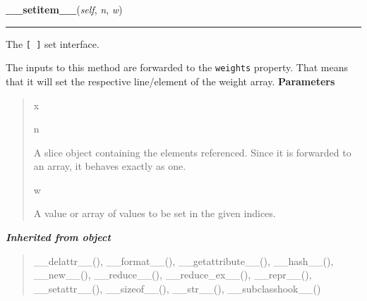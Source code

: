     \label{peach:nn:base:Layer:__setitem__}

    \vspace{0.5ex}

\hspace{.8\funcindent}\begin{boxedminipage}{\funcwidth}

    \raggedright \textbf{\_\_setitem\_\_}(\textit{self}, \textit{n}, \textit{w})

    \vspace{-1.5ex}

    \rule{\textwidth}{0.5\fboxrule}
\setlength{\parskip}{2ex}

The \texttt{{[} {]}} set interface.

The inputs to this method are forwarded to the \texttt{weights} property.
That means that it will set the respective line/element of the weight
array.
\setlength{\parskip}{1ex}
      \textbf{Parameters}
      \vspace{-1ex}

      \begin{quote}
        \begin{Ventry}{x}

          \item[n]


A slice object containing the elements referenced. Since it is
forwarded to an array, it behaves exactly as one.
          \item[w]


A value or array of values to be set in the given indices.
        \end{Ventry}

      \end{quote}

    \end{boxedminipage}


\large{\textbf{\textit{Inherited from object}}}

\begin{quote}
\_\_delattr\_\_(), \_\_format\_\_(), \_\_getattribute\_\_(), \_\_hash\_\_(), \_\_new\_\_(), \_\_reduce\_\_(), \_\_reduce\_ex\_\_(), \_\_repr\_\_(), \_\_setattr\_\_(), \_\_sizeof\_\_(), \_\_str\_\_(), \_\_subclasshook\_\_()
\end{quote}


